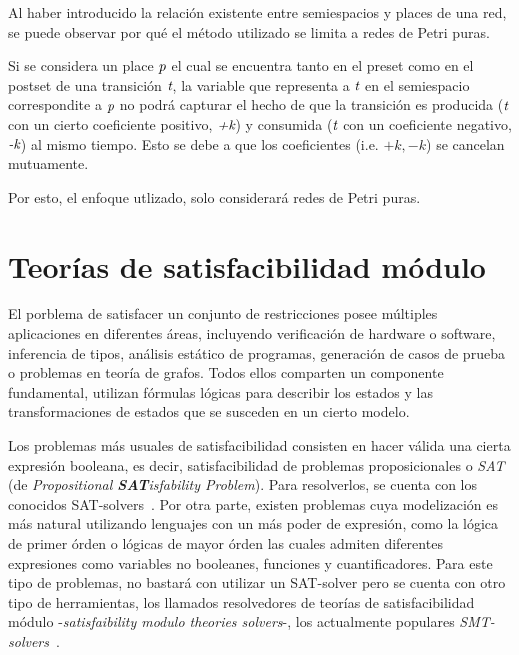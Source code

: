 \begin{remark}
    Al haber introducido la relación existente entre semiespacios y places de una red, 
    se puede observar por qué el método utilizado se limita a redes de Petri puras. 

    Si se considera un place $\emph{p}$ el cual se encuentra tanto en el preset como en el postset
    de una transición $\emph{t}$,  la variable que representa a $\emph{t}$ en el semiespacio 
    correspondite a $\emph{p}$ no podrá capturar el hecho de que la transición
    es producida ($\emph{t}$ con un cierto coeficiente positivo, $\emph{+k}$) 
    y consumida ($\emph{t}$ con un coeficiente negativo, $\emph{-k}$) 
    al mismo tiempo. Esto se debe a que los coeficientes (i.e. $+k,-k$) se cancelan mutuamente.

    Por esto, el enfoque utlizado, solo considerará redes de Petri puras.
\end{remark}

\section{Teorías de satisfacibilidad módulo}
\label{sec:2.smt}

El porblema de satisfacer un conjunto de restricciones posee múltiples aplicaciones
en diferentes áreas, incluyendo verificación de hardware o software, inferencia de 
tipos, análisis estático de programas, generación de casos de prueba o problemas en
teoría de grafos. Todos ellos comparten un componente fundamental, utilizan fórmulas
lógicas para describir los estados y las transformaciones de estados que se susceden
en un cierto modelo.

Los problemas más usuales de satisfacibilidad consisten en hacer válida una cierta 
expresión booleana, es decir, satisfacibilidad de problemas proposicionales 
o \textit{SAT} (de \textit{Propositional \textbf{SAT}isfability Problem}). Para resolverlos,
se cuenta con los conocidos SAT-solvers~\cite{barrettSMT2009}.
Por otra parte, existen problemas cuya modelización es más natural utilizando lenguajes con
un más poder de expresión, como la lógica de primer órden o lógicas de mayor órden las cuales
admiten diferentes expresiones como variables no booleanes, funciones y cuantificadores.
Para este tipo de problemas, no bastará con utilizar un SAT-solver pero se cuenta con
otro tipo de herramientas, los llamados resolvedores de teorías de satisfacibilidad módulo
-\textit{satisfaibility modulo theories solvers}-, los actualmente populares \textit{SMT-solvers}~\cite{deMoura2009}.

